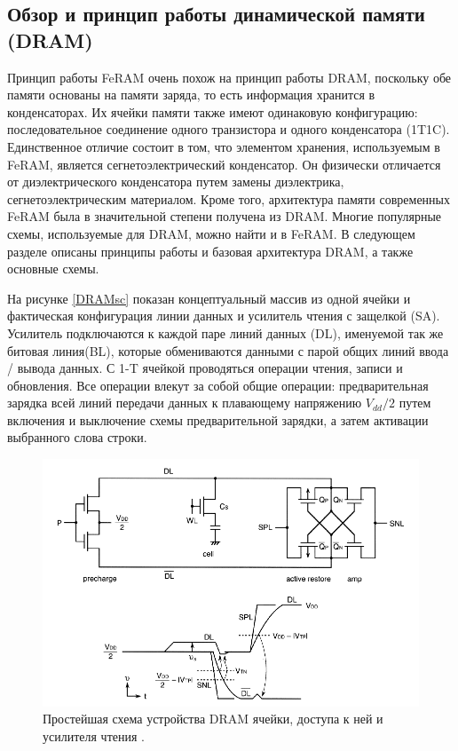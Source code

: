 \documentclass[a4paper,12pt]{article} %
\begin{document}
\subsection{Обзор и принцип работы динамической памяти (DRAM) }
\label{sec:dram}
Принцип работы FeRAM очень похож на принцип работы DRAM, поскольку обе памяти основаны на памяти заряда, то есть информация хранится в конденсаторах. Их ячейки памяти также имеют одинаковую конфигурацию: последовательное соединение одного транзистора и одного конденсатора (1T1C). Единственное отличие состоит в том, что элементом хранения, используемым в FeRAM, является сегнетоэлектрический конденсатор. Он физически отличается от диэлектрического конденсатора путем замены диэлектрика, сегнетоэлектрическим материалом. Кроме того, архитектура памяти современных FeRAM была в значительной степени получена из DRAM. Многие популярные схемы, используемые для DRAM, можно найти и в FeRAM. В следующем разделе описаны принципы работы и базовая архитектура DRAM, а также основные схемы.


На рисунке \eqref{DRAMsc} показан концептуальный массив из одной ячейки  и фактическая конфигурация линии данных и усилитель чтения с защелкой (SA). Усилитель подключаются к каждой паре линий данных (DL), именуемой так же битовая линия(BL), которые обмениваются данными с парой общих линий ввода / вывода данных. С 1-T ячейкой  проводяться операции чтения, записи и обновления. Все операции влекут за собой общие операции: предварительная зарядка всей линий передачи данных к плавающему  напряжению $V_{dd}/2 $ путем включения и выключение схемы предварительной зарядки, а затем активации выбранного слова строки.

\begin{figure}
  \includegraphics[width=\linewidth]{DRAM-sc.png}
  \caption{Простейшая схема устройства DRAM ячейки, доступа к ней и усилителя чтения \cite{DRAM-II}.}
  \label{DRAMsc}
\end{figure}
\end{document}
